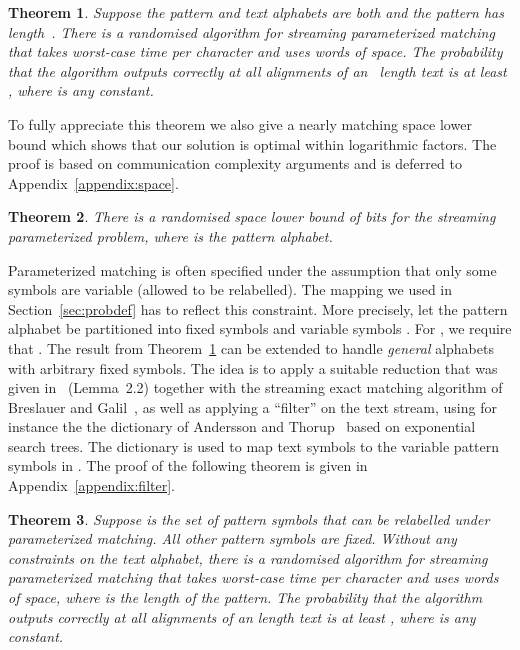 \documentclass[11pt,a4paper]{article}
\theoremstyle{theorem}
\newtheorem{theorem}{Theorem}[]
\begin{document}
\begin{theorem}\label{thm:main}
    Suppose the pattern and text alphabets are both  and the pattern has length~. There is a randomised algorithm for streaming parameterized matching that takes  worst-case time per character and uses  words of space. The probability that the algorithm outputs correctly at all alignments of an ~length text is at least , where  is any constant.
\end{theorem}

To fully appreciate this theorem we also give a nearly matching space lower bound which shows that our solution is optimal within logarithmic factors. The proof is based on communication complexity arguments and is deferred to Appendix~\ref{appendix:space}.

\begin{theorem}
\label{thm:space}
    There is a randomised space lower bound of   bits for the streaming parameterized problem, where  is the pattern alphabet.
\end{theorem}

Parameterized matching is often specified under the assumption that only some symbols are variable (allowed to be relabelled). The mapping  we used in Section~\ref{sec:probdef} has to reflect this constraint. More precisely, let the pattern alphabet be partitioned into fixed symbols  and variable symbols . For , we require that . The result from Theorem~\ref{thm:main} can be extended to handle \emph{general} alphabets with arbitrary fixed symbols. The idea is to apply a suitable reduction that was given in~\cite{AFM:1994} (Lemma~2.2) together with the streaming exact matching algorithm of Breslauer and Galil~\cite{BG:2011}, as well as applying a ``filter'' on the text stream, using for instance the
the dictionary of Andersson and Thorup~\cite{AT:2000} based on exponential search trees. The dictionary is used to map text symbols to the variable pattern symbols in . The proof of the following theorem is given in Appendix~\ref{appendix:filter}.

\begin{theorem}
    \label{thm:filter}
    Suppose  is the set of pattern symbols that can be relabelled under parameterized matching. All other pattern symbols are fixed. Without any constraints on the text alphabet, there is a randomised algorithm for streaming parameterized matching that takes  worst-case time per character and uses  words of space, where  is the length of the pattern. The probability that the algorithm outputs correctly at all alignments of an  length text is at least , where  is any constant.
\end{theorem}
\end{document}
